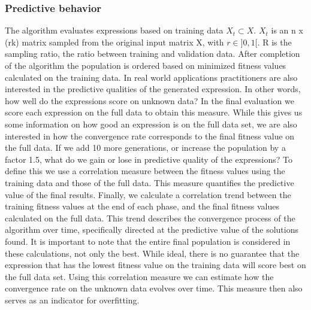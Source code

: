\subsubsection{Predictive behavior}
The algorithm evaluates expressions based on training data $X_t \subset X$. $X_t$ is an n x (rk) matrix sampled from the original input matrix X, with $r \in ] 0,1 [$.
R is the sampling ratio, the ratio between training and validation data.
After completion of the algorithm the population is ordered based on minimized fitness values calculated on the training data.
In real world applications practitioners are also interested in the predictive qualities of the generated expression. In other words, how well do the expressions score on unknown data? In the final evaluation we score each expression on the full data to obtain this measure.
While this gives us some information on how good an expression is on the full data set, we are also interested in how the convergence rate corresponds to the final fitness value on the full data.
If we add 10 more generations, or increase the population by a factor 1.5, what do we gain or lose in predictive quality of the expressions?
To define this we use a correlation measure between the fitness values using the training data and those of the full data.
This measure quantifies the predictive value of the final results.
Finally, we calculate a correlation trend between the training fitness values at the end of each phase, and the final fitness values calculated on the full data. This trend describes the convergence process of the algorithm over time, specifically directed at the predictive value of the solutions found. It is important to note that the entire final population is considered in these calculations, not only the best. While ideal, there is no guarantee that the expression that has the lowest fitness value on the training data will score best on the full data set. Using this correlation measure we can estimate how the convergence rate on the unknown data evolves over time. This measure then also serves as an indicator for overfitting.

